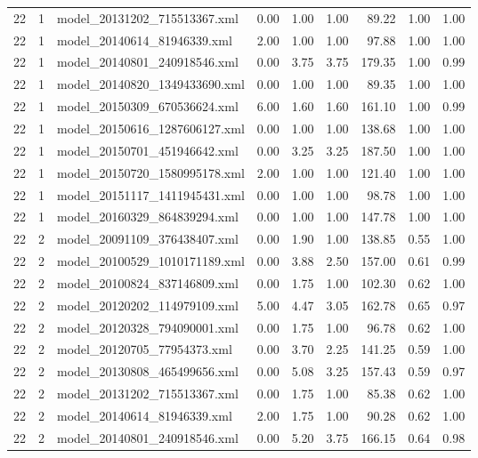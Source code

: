 \begin{table}[ht]
\begin{tabular}{rrlrrrrrr}
   22 &   1 & model\_20131202\_715513367.xml & 0.00 & 1.00 & 1.00 & 89.22 & 1.00 & 1.00 \\ 
   22 &   1 & model\_20140614\_81946339.xml & 2.00 & 1.00 & 1.00 & 97.88 & 1.00 & 1.00 \\ 
   22 &   1 & model\_20140801\_240918546.xml & 0.00 & 3.75 & 3.75 & 179.35 & 1.00 & 0.99 \\ 
   22 &   1 & model\_20140820\_1349433690.xml & 0.00 & 1.00 & 1.00 & 89.35 & 1.00 & 1.00 \\ 
   22 &   1 & model\_20150309\_670536624.xml & 6.00 & 1.60 & 1.60 & 161.10 & 1.00 & 0.99 \\ 
   22 &   1 & model\_20150616\_1287606127.xml & 0.00 & 1.00 & 1.00 & 138.68 & 1.00 & 1.00 \\ 
   22 &   1 & model\_20150701\_451946642.xml & 0.00 & 3.25 & 3.25 & 187.50 & 1.00 & 1.00 \\ 
   22 &   1 & model\_20150720\_1580995178.xml & 2.00 & 1.00 & 1.00 & 121.40 & 1.00 & 1.00 \\ 
   22 &   1 & model\_20151117\_1411945431.xml & 0.00 & 1.00 & 1.00 & 98.78 & 1.00 & 1.00 \\ 
   22 &   1 & model\_20160329\_864839294.xml & 0.00 & 1.00 & 1.00 & 147.78 & 1.00 & 1.00 \\ 
   22 &   2 & model\_20091109\_376438407.xml & 0.00 & 1.90 & 1.00 & 138.85 & 0.55 & 1.00 \\ 
   22 &   2 & model\_20100529\_1010171189.xml & 0.00 & 3.88 & 2.50 & 157.00 & 0.61 & 0.99 \\ 
   22 &   2 & model\_20100824\_837146809.xml & 0.00 & 1.75 & 1.00 & 102.30 & 0.62 & 1.00 \\ 
   22 &   2 & model\_20120202\_114979109.xml & 5.00 & 4.47 & 3.05 & 162.78 & 0.65 & 0.97 \\ 
   22 &   2 & model\_20120328\_794090001.xml & 0.00 & 1.75 & 1.00 & 96.78 & 0.62 & 1.00 \\ 
   22 &   2 & model\_20120705\_77954373.xml & 0.00 & 3.70 & 2.25 & 141.25 & 0.59 & 1.00 \\ 
   22 &   2 & model\_20130808\_465499656.xml & 0.00 & 5.08 & 3.25 & 157.43 & 0.59 & 0.97 \\ 
   22 &   2 & model\_20131202\_715513367.xml & 0.00 & 1.75 & 1.00 & 85.38 & 0.62 & 1.00 \\ 
   22 &   2 & model\_20140614\_81946339.xml & 2.00 & 1.75 & 1.00 & 90.28 & 0.62 & 1.00 \\ 
   22 &   2 & model\_20140801\_240918546.xml & 0.00 & 5.20 & 3.75 & 166.15 & 0.64 & 0.98 \\ 

\end{tabular}
\end{table}
